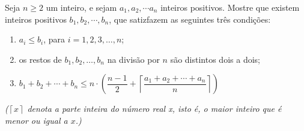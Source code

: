 Seja $n \ge 2$ um inteiro, e sejam $a_1, a_2, \cdots a_n$ inteiros positivos. Mostre que existem inteiros positivos $b_1, b_2, \cdots, b_n$, que satizfazem as seguintes três condições:

\begin{enumerate}
	\item $a_i \le b_i$, para $i = 1, 2, 3, \dots, n$;
	\item os restos de $b_1, b_2, \dots, b_n$ na divisão por $n$ são distintos dois a dois;
	\item $b_1 + b_2 + \cdots + b_n \le n \cdot \left( \dfrac{n-1}{2} + \left \lceil{\dfrac{a_1 + a_2 + \cdots + a_n}{n}}\right \rceil \right)$
\end{enumerate}

\textit{($\left \lceil{x}\right \rceil$ denota a parte inteira do número real x, isto é, o maior inteiro que é menor ou igual a $x$.)}